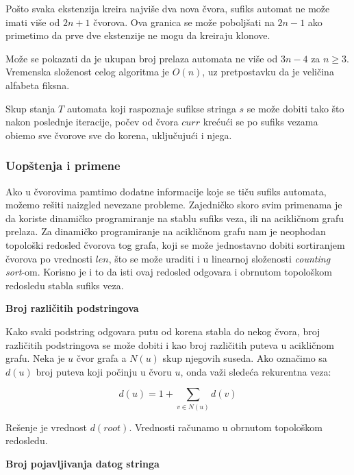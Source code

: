 Po\v sto svaka ekstenzija kreira najvi\v se dva nova \v cvora, sufiks automat ne mo\v ze imati vi\v se od $2n+1$ \v cvorova. Ova granica se mo\v ze pobolj\v sati na $2n-1$ ako primetimo da prve dve ekstenzije ne mogu da kreiraju klonove.

Mo\v ze se pokazati da je ukupan broj prelaza automata ne vi\v se od $3n-4$ za $n \geq 3$. Vremenska slo\v zenost celog algoritma je $O(n)$, uz pretpostavku da je veli\v cina alfabeta fiksna. \cite{suffixautomatonrad}

Skup stanja $T$ automata koji raspoznaje sufikse stringa $s$ se mo\v ze dobiti tako \v sto nakon poslednje iteracije, po\v cev od \v cvora $curr$ kre\' cu\' ci se po sufiks vezama obi\dj emo sve \v cvorove sve do korena, uklju\v cuju\' ci i njega.

\subsubsection{Uop\v stenja i primene}

Ako u \v cvorovima pamtimo dodatne informacije koje se ti\v cu sufiks automata, mo\v zemo re\v siti naizgled nevezane probleme. Zajedni\v cko skoro svim primenama je da koriste dinami\v cko programiranje na stablu sufiks veza, ili na acikli\v cnom grafu prelaza. Za dinami\v cko programiranje na acikli\v cnom grafu nam je neophodan topolo\v ski redosled \v cvorova tog grafa, koji se mo\v ze jednostavno dobiti sortiranjem \v cvorova po vrednosti $len$, \v sto se mo\v ze uraditi i u linearnoj slo\v zenosti \textit{counting sort}-om. Korisno je i to da isti ovaj redosled odgovara i obrnutom topolo\v skom redosledu stabla sufiks veza.

\noindent
\textbf{Broj razli\v citih podstringova}

Kako svaki podstring odgovara putu od korena stabla do nekog \v cvora, broj razli\v citih podstringova se mo\v ze dobiti i kao broj razli\v citih puteva u acikli\v cnom grafu. Neka je $u$ \v cvor grafa a $N(u)$ skup njegovih suseda. Ako ozna\v cimo sa $d(u)$ broj puteva koji po\v cinju u \v cvoru $u$, onda va\v zi slede\' ca rekurentna veza:

\begin{equation}
    d(u) = 1 + \sum_{v \in N(u)} d(v)
\end{equation}

Re\v senje je vrednost $d(root)$. Vrednosti ra\v cunamo u obrnutom topolo\v skom redosledu.

\noindent
\textbf{Broj pojavljivanja datog stringa}

